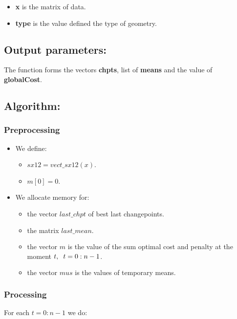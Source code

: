 \documentclass{report}
\begin{document}
\begin{itemize}
	\item {\bfseries x} is the matrix of data.
	\item {\bfseries type} is the value defined the type of geometry.
\end{itemize}

\subsection*{Output parameters:}

The function forms the vectors {\bfseries chpts}, list of {\bfseries means} and the value of {\bfseries globalCost}.

\subsection*{Algorithm:}

\subsubsection*{Preprocessing}

\begin{itemize}
	\item We define:
	\begin{itemize}
		\item $sx12 = vect\_sx12(x)$.	
		\item $m[0] = 0$.
	\end{itemize}	
	\item We allocate memory for: 
	\begin{itemize}
		\item the vector $last\_chpt$ of best last changepoints.
		\item the matrix $last\_mean$.
		\item the vector  $m$ is the value of the sum optimal cost and penalty at the moment $t,  \hspace*{2mm} t = 0:n-1$.
		\item the vector  $mus$ is the values of temporary means.
	\end{itemize}	
\end{itemize}

\subsubsection*{Processing}

For each $t = 0:n-1$ we do:
 
\end{document}
